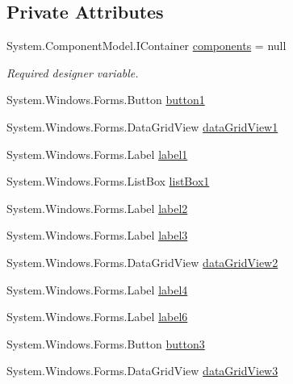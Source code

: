 \subsection*{Private Attributes}
\begin{DoxyCompactItemize}
\item 
System.\+Component\+Model.\+I\+Container \hyperlink{classPCO_1_1__0_1_1RegisterEventForm_a74923b3f8c64b3221e31005393942d4b}{components} = null
\begin{DoxyCompactList}\small\item\em Required designer variable. \end{DoxyCompactList}\item 
System.\+Windows.\+Forms.\+Button \hyperlink{classPCO_1_1__0_1_1RegisterEventForm_ad03ef1b81269d53e21cd908c97a4ba88}{button1}
\item 
System.\+Windows.\+Forms.\+Data\+Grid\+View \hyperlink{classPCO_1_1__0_1_1RegisterEventForm_ae7e8ab321760d7d8e5576c2fb4997c67}{data\+Grid\+View1}
\item 
System.\+Windows.\+Forms.\+Label \hyperlink{classPCO_1_1__0_1_1RegisterEventForm_a33de43a0ef115a2e496be92676029fb7}{label1}
\item 
System.\+Windows.\+Forms.\+List\+Box \hyperlink{classPCO_1_1__0_1_1RegisterEventForm_abb9877d3121bf3c5e7fb0e63d63c4880}{list\+Box1}
\item 
System.\+Windows.\+Forms.\+Label \hyperlink{classPCO_1_1__0_1_1RegisterEventForm_a6b8bfafaa0944d0aa0b72a91eebb2a1b}{label2}
\item 
System.\+Windows.\+Forms.\+Label \hyperlink{classPCO_1_1__0_1_1RegisterEventForm_abe6115c6fe60e2f78832b7927c3b7c53}{label3}
\item 
System.\+Windows.\+Forms.\+Data\+Grid\+View \hyperlink{classPCO_1_1__0_1_1RegisterEventForm_ac65bdd45c05f09fe9ea063acb5f50a87}{data\+Grid\+View2}
\item 
System.\+Windows.\+Forms.\+Label \hyperlink{classPCO_1_1__0_1_1RegisterEventForm_a1c09d5156913257b2e9f20aec80003c5}{label4}
\item 
System.\+Windows.\+Forms.\+Label \hyperlink{classPCO_1_1__0_1_1RegisterEventForm_a3f48b3282180f7d832e660f2b26dcf74}{label6}
\item 
System.\+Windows.\+Forms.\+Button \hyperlink{classPCO_1_1__0_1_1RegisterEventForm_ad060b09ffb4cc57342e0c792eeb6d26f}{button3}
\item 
System.\+Windows.\+Forms.\+Data\+Grid\+View \hyperlink{classPCO_1_1__0_1_1RegisterEventForm_afa7b61b2882e2e3eed3e2bcb5bfa3757}{data\+Grid\+View3}

\end{DoxyCompactItemize}
